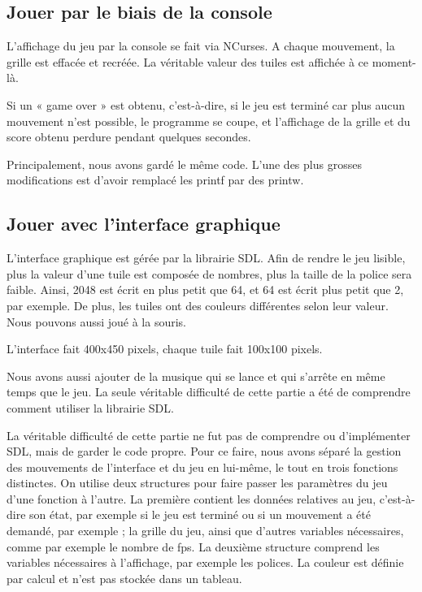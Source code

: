 \documentclass[12pt]{report}
\begin{document}
\subsection{Jouer par le biais de la console} 
L’affichage du jeu par la console se fait via NCurses. A chaque mouvement, la grille est effacée et recréée. La véritable valeur des tuiles est affichée à ce moment-là.

Si un « game over » est obtenu, c’est-à-dire, si le jeu est terminé car plus aucun mouvement n’est possible, le programme se coupe, et l’affichage de la grille et du score obtenu perdure pendant quelques secondes.

Principalement, nous avons gardé le même code. L’une des plus grosses modifications est d’avoir remplacé les printf par des printw.

\subsection{Jouer avec l’interface graphique}
L’interface graphique est gérée par la librairie SDL. Afin de rendre le jeu lisible, plus la valeur d’une tuile est composée de nombres, plus la taille de la police sera faible. Ainsi, 2048 est écrit en plus petit que 64, et 64 est écrit plus petit que 2, par exemple. De plus, les tuiles ont des couleurs différentes selon leur valeur. Nous pouvons aussi joué à la souris.

L’interface fait 400x450 pixels, chaque tuile fait 100x100 pixels.

Nous avons aussi ajouter de la musique qui se lance et qui s’arrête en même temps que le jeu.
La seule véritable difficulté de cette partie a été de comprendre comment utiliser la librairie SDL. \cite{ref3} \cite{ref4}

La véritable difficulté de cette partie ne fut pas de comprendre ou d’implémenter SDL, mais de garder le code propre. Pour ce faire, nous avons séparé la gestion des mouvements de l’interface et du  jeu en lui-même, le tout en trois fonctions distinctes.
On utilise deux structures pour faire passer les paramètres du jeu d’une fonction à l’autre. La première contient les données relatives au jeu, c’est-à-dire son état, par exemple si le jeu est terminé ou si un mouvement a été demandé, par exemple ; la grille du jeu, ainsi que d’autres variables nécessaires, comme par exemple le nombre de fps.
La deuxième structure comprend les variables nécessaires à l’affichage, par exemple les polices.
La couleur est définie par calcul et n’est pas stockée dans un tableau.
\end{document}
